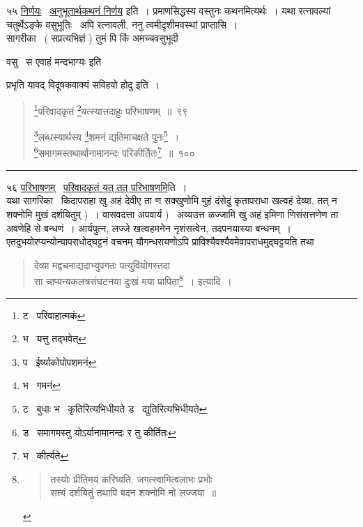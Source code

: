 \documentclass[11pt, openany]{book}
\begin{document}
५५ \underline{निर्णयः} \textendash\ \underline{अनुभूतार्थकथनं निर्णय} इति~। प्रमाणसिद्धस्य वस्तुनः कथनमित्यर्थः~। यथा रत्नावल्यां चतुर्थेऽङ्के वसुभूतिः \textendash\ अपि रत्नावली, ननु त्वमीदृशीमवस्थां प्राप्तासि~।\\

सागरीका \textendash\ ( सप्रत्यभिज्ञं ) तुमं पि किं अमच्चवसुभूदी

वसु \textendash\ स एवाहं मन्दभाग्यः इति\textendash 

प्रभृति यावद् विदूषकवाक्यं {\qt सविहवो होदु } इति~।


\newpage
\lfoot{}

\begin{quote}
{\na \renewcommand{\thefootnote}{1}\footnote{ट \textendash\ परिवाहात्मकं}परिवादकृतं \renewcommand{\thefootnote}{2}\footnote{भ \textendash\ यत्तु तद्भवेत्}यत्स्यात्तदाहुः परिभाषणम्~॥~९९

\renewcommand{\thefootnote}{3}\footnote{प \textendash\ ईर्ष्याकोपोपशमनं}लब्धस्यार्थस्य \renewcommand{\thefootnote}{4}\footnote{भ \textendash\ गमनं}शमनं द्यतिमाचक्षते पुनः\renewcommand{\thefootnote}{5}\footnote{ट \textendash\ बुधाः भ \textendash\ कृतिरित्यभिधीयते ड \textendash\ द्युतिरित्यभिधीयते}~।\\
\renewcommand{\thefootnote}{6}\footnote{ड \textendash\ समागमस्तु योऽर्यानामानन्दः र तु कीर्तितः}समागमस्तथार्थानामानन्दः परिकीर्तितः\renewcommand{\thefootnote}{7}\footnote{भ \textendash\ कीर्त्यते}~॥~१००}
\end{quote}

\hrule

\vspace{2mm}
५६ \underline{परिभाषणम्} \textendash\ \underline{परिवादकृतं यत् तत् परिभाषणमि}ति~।\\

यथा सागरिका \textendash\ किदापराहा खु अहं देवीए ता ण सक्खुणोमि मुहं दंसेदुं कृतापराधा खल्वहं देव्या, तत् न शक्नोमि मुखं दर्शयितुम् )~। वासवदत्ता अपवार्य ) \textendash\ अय्यउत्त ळज्जामि खु अहं इमिणा णिसंसत्तणेण ता अवणेहि से बन्धणं~। आर्यपुत्न, लज्जे खल्वहमनेन नृशंसत्वेन, तदपनयास्या बन्धनम्~।\\

एतदुभयोरप्यन्योन्यापराधोद्घट्टनं वचनम् यौगन्धरायणोऽपि प्राविश्यैवश्यैवमेवापराधमुद्घट्टयति तथा \textendash

\begin{quote}
{\qt देव्या मद्वचनाद्यदाभ्युपगतः पत्युविंयोगस्तदा\\
सा चाप्यन्यकलत्रसंघटनया दुःखं मया प्रापिता\renewcommand{\thefootnote}{*}\footnote{\begin{quote}
{\qt तस्योः प्रीतिमयं करिष्यति, जगत्स्वामित्वलाभः प्रभोः\\
सत्यं दर्शयितुं तथापि बदन शक्नोमि नो लज्जया~॥}
\end{quote}}~।} इत्यादि~।
\end{quote}
\end{document}
